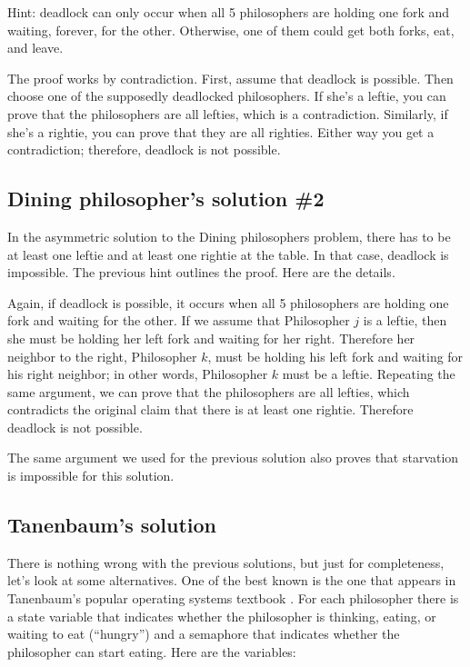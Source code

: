 \documentclass{book}
\newcommand{\clearemptydoublepage}{\newpage\cleardoublepage}
\begin{document}
Hint: deadlock can only occur when all 5 philosophers are holding
one fork and waiting, forever, for the other.  Otherwise, one of
them could get both forks, eat, and leave.

The proof works by contradiction.  First, assume that deadlock is
possible.  Then choose one of the supposedly deadlocked philosophers.
If she's a leftie, you can prove that the philosophers are all
lefties, which is a contradiction.  Similarly, if she's a rightie, you
can prove that they are all righties.  Either way you get a
contradiction; therefore, deadlock is not possible.


\clearemptydoublepage
\subsection{Dining philosopher's solution \#2}

In the asymmetric solution to the Dining philosophers problem,
there has to be at least one leftie and at least one rightie at
the table.  In that case, deadlock is impossible.  The previous
hint outlines the proof.  Here are the details.

Again, if deadlock is possible, it occurs when all 5 philosophers
are holding one fork and waiting for the other.  If we assume that
Philosopher $j$ is a leftie, then she must be holding her left
fork and waiting for her right.  Therefore her neighbor to the right,
Philosopher $k$, must be holding his left fork and waiting for
his right neighbor; in other words, Philosopher $k$ must be a leftie.
Repeating the same argument, we can prove that the philosophers
are all lefties, which contradicts the original claim that there
is at least one rightie.  Therefore deadlock is not possible.

The same argument we used for the previous solution also proves
that starvation is impossible for this solution.


\clearemptydoublepage
\subsection{Tanenbaum's solution}

There is nothing wrong with the previous solutions, but just for
completeness, let's look at some alternatives.  One of the best known
is the one that appears in Tanenbaum's popular operating systems
textbook \cite{tanenbaum}.
For each philosopher there is a state variable that
indicates whether the philosopher is thinking, eating, or waiting to
eat (``hungry'') and a semaphore that indicates whether the
philosopher can start eating.  Here are the variables:
\end{document}
